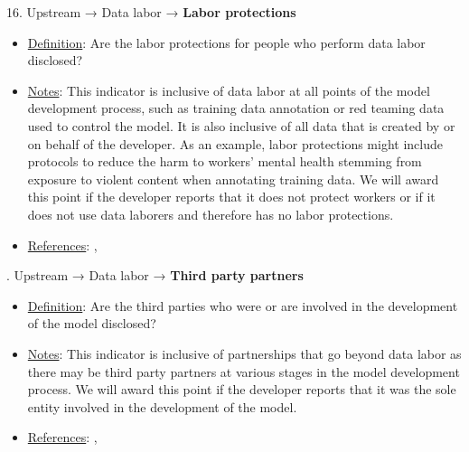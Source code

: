 16. Upstream → Data labor → \textbf{Labor protections}
\vspace{-\parskip}
\begin{itemize}
\item
\underline{Definition}: Are the labor protections for people who perform data labor disclosed?
\item
\underline{Notes}: This indicator is inclusive of data labor at all points of the model development process, such as training data annotation or red teaming data used to control the model. It is also inclusive of all data that is created by or on behalf of the developer. As an example, labor protections might include protocols to reduce the harm to workers' mental health stemming from exposure to violent content when annotating training data. We will award this point if the developer reports that it does not protect workers or if it does not use data laborers and therefore has no labor protections.
\item
\underline{References}: \citet{crawford2021atlas}, \citet{gray2019ghost}
\end{itemize} \vspace{\baselineskip}


. Upstream → Data labor → \textbf{Third party partners}
\vspace{-\parskip}
\begin{itemize}
\item
\underline{Definition}: Are the third parties who were or are involved in the development of the model disclosed?
\item
\underline{Notes}: This indicator is inclusive of partnerships that go beyond data labor as there may be third party partners at various stages in the model development process. We will award this point if the developer reports that it was the sole entity involved in the development of the model.
\item
\underline{References}: \citet{crawford2021atlas}, \citet{gray2019ghost}
\end{itemize} \vspace{\baselineskip}


